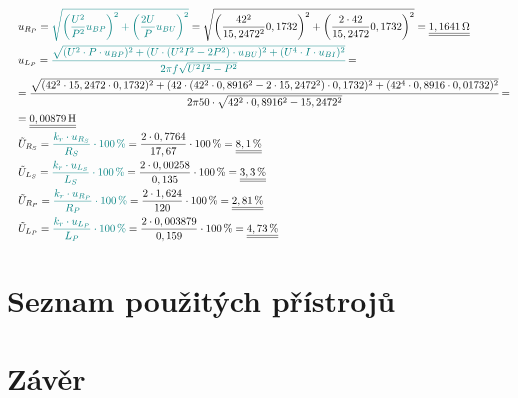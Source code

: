 \documentclass[a4paper, czech]{article}
\begin{document}
\begin{enumerate}
\begin{multline*}
        \ \ \ u_{R_P} = \textcolor{teal}{\sqrt{\left(\frac{U^2}{P^2}u_{BP}\right)^2 + \left(\frac{2U}{P}u_{BU}\right)^2}} = \sqrt{\left(\frac{42^2}{15,2472^2}0,1732\right)^2 + \left(\frac{2 \cdot 42}{15,2472}0,1732\right)^2} = \underline{\underline{1,1641\,\Omega}} \hfill \\
        \ \ \ u_{L_P} = \textcolor{teal}{\cfrac{\sqrt{(U^2 \cdot P \cdot u_{BP})^2 + (U \cdot (U^2I^2 - 2P^2) \cdot u_{BU})^2 + (U^4\cdot I \cdot u_{BI})^2}}{2 \pi f \sqrt{U^2I^2-P^2}}} = \hfill \\
        \ \ \ = \cfrac{\sqrt{(42^2 \cdot 15,2472 \cdot 0,1732)^2 + (42 \cdot (42^2 \cdot 0,8916^2 - 2 \cdot 15,2472^2) \cdot 0,1732)^2 + (42^4\cdot 0,8916 \cdot 0,01732)^2}}{2 \pi 50 \cdot \sqrt{42^2 \cdot 0,8916^2-15,2472^2}} = \hfill \\
        \ \ \ = \underline{\underline{0,00879\,\text{H}}} \hfill \\
        \ \ \ \tilde{U}_{R_S} = \textcolor{teal}{\frac{k_r \cdot u_{R_S}}{R_S} \cdot 100\,\%} = \frac{2 \cdot 0,7764}{17,67} \cdot 100\,\% = \underline{\underline{8,1\,\%}} \hfill \\
        \ \ \ \tilde{U}_{L_S} = \textcolor{teal}{\frac{k_r \cdot u_{L_S}}{L_S} \cdot 100\,\%} = \frac{2 \cdot 0,00258}{0,135} \cdot 100\,\% = \underline{\underline{3,3\,\%}} \hfill \\
        \ \ \ \tilde{U}_{R_P} = \textcolor{teal}{\frac{k_r \cdot u_{R_P}}{R_P} \cdot 100\,\%} = \frac{2 \cdot 1,624}{120} \cdot 100\,\% = \underline{\underline{2,81\,\%}} \hfill \\
        \ \ \ \tilde{U}_{L_P} = \textcolor{teal}{\frac{k_r \cdot u_{L_P}}{L_P} \cdot 100\,\%} = \frac{2 \cdot 0,003879}{0,159} \cdot 100\,\% = \underline{\underline{4,73\,\%}} \hfill
    \end{multline*}
\end{enumerate}

\section{Seznam použitých přístrojů}

\section{Závěr}
\end{document}
